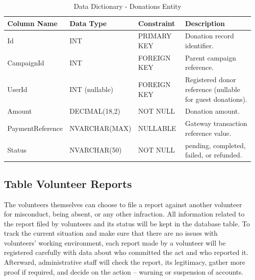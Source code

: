 \documentclass{thesis-library}
\begin{document}
\begin{table}[H]
    \centering
    \caption{Data Dictionary - Donations Entity}
    \vspace{10pt}
    \begin{tabularx}{\linewidth}{|l|l|l|L|}
        \hline
        \textbf{Column Name} & \textbf{Data Type} & \textbf{Constraint} & \textbf{Description} \\
        \hline
        Id & INT & PRIMARY KEY & Donation record identifier. \\
        \hline
        CampaignId & INT & FOREIGN KEY & Parent campaign reference. \\
        \hline
        UserId & INT (nullable) & FOREIGN KEY & Registered donor reference (nullable for guest donations). \\
        \hline
        Amount & DECIMAL(18,2) & NOT NULL & Donation amount. \\
        \hline
        PaymentReference & NVARCHAR(MAX) & NULLABLE & Gateway transaction reference value. \\
        \hline
        Status & NVARCHAR(50) & NOT NULL & pending, completed, failed, or refunded. \\
        \hline
    \end{tabularx}
\end{table}

\subsection{Table Volunteer Reports}

The volunteers themselves can choose to file a report against another volunteer for misconduct, being absent, or any other infraction. All information related to the report filed by volunteers and its status will be kept in the database table. To track the current situation and make sure that there are no issues with volunteers’ working environment, each report made by a volunteer will be registered carefully with data about who committed the act and who reported it. Afterward, administrative staff will check the report, its legitimacy, gather more proof if required, and decide on the action – warning or suspension of accounts.
\end{document}
